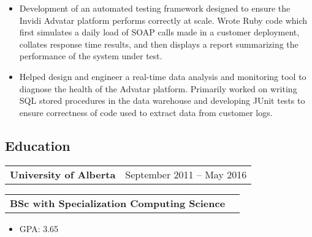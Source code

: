 \documentclass[10pt,letterpaper]{article}
\makeatletter
\newcommand{\headerrow}[2]
{\begin{tabular*}{\linewidth}{l@{\extracolsep{\fill}}r}
	#1 &
	#2 \\
\end{tabular*}}
\makeatother
\begin{document}
       \begin{itemize}
          \itemsep0em
                \item Development of an automated testing framework designed to ensure the Invidi Advatar platform performs correctly at scale. Wrote Ruby code which first simulates a daily load of SOAP calls made in a customer deployment, collates response time results, and then displays a report summarizing the performance of the system under test.
                \item Helped design and engineer a real-time data analysis and monitoring tool to diagnose the health of the Advatar platform. Primarily worked on writing SQL stored procedures in the data warehouse and developing JUnit tests to ensure correctness of code used to extract data from customer logs.
        \end{itemize}
\vspace{-1em}
\subsection*{Education}
	\headerrow
		{\textbf{University of Alberta}}
		{September 2011 -- May 2016}
	\headerrow
		{\textbf{BSc with Specialization Computing Science}}
		{}
	\begin{itemize}
          \itemsep0em
          \item GPA: 3.65
	\end{itemize}
\vspace{-1em}
\vspace{-0.45em}
\end{document}
